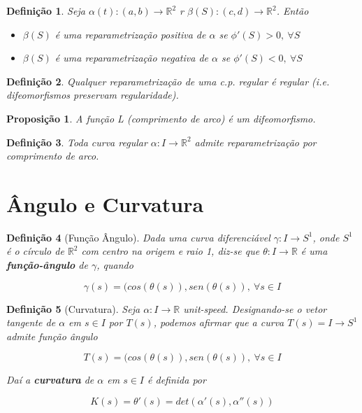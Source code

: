 \documentclass{article}
\newtheorem{prop}{Proposição}
\newtheorem{definition}{Definição}
\begin{document}
\begin{definition}
Seja $\alpha(t): (a, b) \rightarrow \mathbb{R}^2$ r $\beta(S): (c, d) \rightarrow \mathbb{R}^2$. Então

\begin{itemize}
    \item $\beta(S)$ é uma reparametrização positiva de $\alpha$ se $\phi'(S) > 0,\ \forall S$
    \item $\beta(S)$ é uma reparametrização negativa de $\alpha$ se $\phi'(S) < 0,\ \forall S$
\end{itemize}
\end{definition}

\begin{definition}
Qualquer reparametrização de uma c.p. regular é regular (i.e. difeomorfismos preservam regularidade).
\end{definition}

\begin{prop}
A função L (comprimento de arco) é um difeomorfismo.
\end{prop}

\begin{definition}
Toda curva regular $\alpha: I \rightarrow \mathbb{R}^2$ admite reparametrização por comprimento de arco.
\end{definition}

\section*{Ângulo e Curvatura}
\label{s3}

\begin{definition}[Função Ângulo]
Dada uma curva diferenciável $\gamma: I \rightarrow S^1$, onde $S^1$ é o círculo de $\mathbb{R}^2$ com centro na origem e raio 1, diz-se que $\theta: I \rightarrow \mathbb{R}$ é uma \textbf{função-ângulo} de $\gamma$, quando

$$\gamma(s) = (cos(\theta(s)), sen(\theta(s)),\ \forall s \in I$$
\end{definition}

\begin{definition}[Curvatura]
Seja $\alpha: I \rightarrow \mathbb{R}$ unit-speed. Designando-se o vetor tangente de $\alpha$ em $s \in I$ por $T(s)$, podemos afirmar que a curva $T(s) = I \rightarrow S^1$ admite função ângulo

$$T(s) = (cos(\theta(s)), sen(\theta(s)),\ \forall s \in I$$

Daí a \textbf{curvatura} de $\alpha$ em $s \in I$ é definida por

$$K(s) = \theta'(s) = det(\alpha'(s), \alpha''(s))$$
\end{definition}
\end{document}
